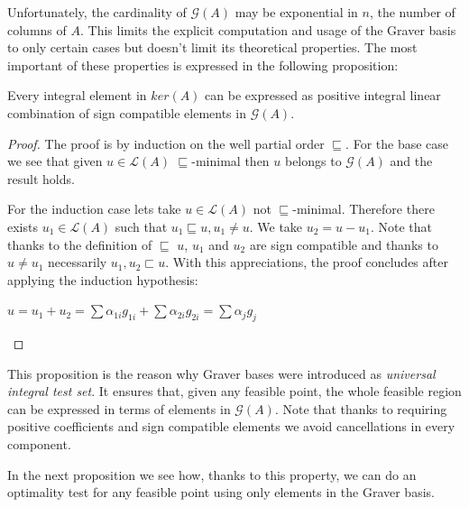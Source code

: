 Unfortunately, the cardinality of $\mathcal{G}(A)$ may be exponential in $n$, the number of columns of $A$. This limits the explicit computation and usage of the Graver basis to only certain cases but doesn't limit its theoretical properties. The most important of these properties is expressed in the following proposition:

\begin{proposition}\label{GB_test_set}
Every integral element in $ker(A)$ can be expressed as positive integral linear combination of sign compatible elements in $\mathcal{G}(A)$.
\end{proposition}
\vspace{-20pt}
\begin{proof}
The proof is by induction on the well partial order $\sqsubseteq$. For the base case we see that given $u \in \mathcal{L}(A)$ $\sqsubseteq$-minimal then $u$ belongs to $\mathcal{G}(A)$ and the result holds.

For the induction case lets take $u \in \mathcal{L}(A)$ not $\sqsubseteq$-minimal. Therefore there exists $u_1 \in \mathcal{L}(A)$ such that $u_1 \sqsubseteq u, u_1 \neq u$. We take $u_2 = u - u_1$. Note that thanks to the definition of $\sqsubseteq$ $u$, $u_1$ and $u_2$ are sign compatible and thanks to $u \neq u_1$ necessarily  $u_1,u_2 \sqsubset u$. With this appreciations, the proof concludes after applying the induction hypothesis:\\
\vspace{-30pt}
\begin{center}
    $u = u_1 + u_2 = \sum \alpha_{1i}g_{1i} + \sum \alpha_{2i}g_{2i} = \sum \alpha_{j}g_{j}$
\end{center}
\end{proof}

This proposition is the reason why Graver bases were introduced as \textit{universal integral test set}. It ensures that, given any feasible point, the whole feasible region can be expressed in terms of elements in $\mathcal{G}(A)$. Note that thanks to requiring positive coefficients and sign compatible elements we avoid cancellations in every component. 

In the next proposition we see how, thanks to this property, we can do an optimality test for any feasible point using only elements in the Graver basis.

